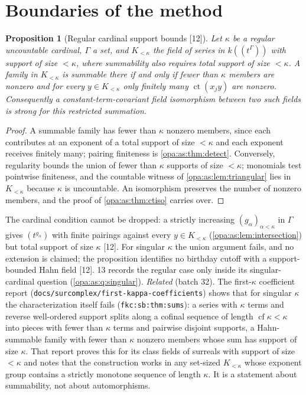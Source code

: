 \documentclass[11pt,oneside]{article}
\numberwithin{equation}{section}
\newtheorem{proposition}[proposition]{Proposition}
\theoremstyle{definition}
\theoremstyle{remark}
\newcommand{\ct}{\operatorname{ct}}
\newcommand{\Hahn}[2]{#1((t^{#2}))}
\newcommand{\src}[1]{\textup{\textsf{\small[#1]}}}
\newcommand{\lbl}[1]{\nolinkurl{#1}}
\newcommand{\fn}[1]{\nolinkurl{#1}}
\begin{document}
\section{Boundaries of the method}\label{opa:as:sec:bound}

\begin{proposition}[Regular cardinal support bounds \src{12}]\label{opa:as:prop:kappa}
Let $\kappa$ be a regular uncountable cardinal, $\Gamma$ a set, and $K_{<\kappa}$ the field of series in $\Hahn k\Gamma$
with support of size $<\kappa$, where summability also requires total support of size $<\kappa$. A family in
$K_{<\kappa}$ is summable there if and only if fewer than $\kappa$ members are nonzero and for every $y\in K_{<\kappa}$
only finitely many $\ct(x_jy)$ are nonzero. Consequently a constant-term-covariant field isomorphism between two such
fields is strong for this restricted summation.
\end{proposition}
\begin{proof}
A summable family has fewer than $\kappa$ nonzero members, since each contributes at an exponent of a total support of
size $<\kappa$ and each exponent receives finitely many; pairing finiteness is \cref{opa:as:thm:detect}. Conversely,
regularity bounds the union of fewer than $\kappa$ supports of size $<\kappa$; monomials test pointwise finiteness, and
the countable witness of \cref{opa:as:lem:triangular} lies in $K_{<\kappa}$ because $\kappa$ is uncountable. An
isomorphism preserves the number of nonzero members, and the proof of \cref{opa:as:thm:ctiso} carries over.
\end{proof}

The cardinal condition cannot be dropped: a strictly increasing $(g_\alpha)_{\alpha<\kappa}$ in $\Gamma$ gives
$(t^{g_\alpha})$ with finite pairings against every $y\in K_{<\kappa}$ (\cref{opa:as:lem:intersection}) but total
support of size $\kappa$ \src{12}. For singular $\kappa$ the union argument fails, and no extension is claimed; the
proposition identifies no birthday cutoff with a support-bounded Hahn field \src{12}. 13 records the regular case only
inside its singular-cardinal question (\cref{opa:as:q:singular}).
\emph{Related} (batch 32). The first-$\kappa$ coefficient report
(\fn{docs/surcomplex/first-kappa-coefficients}) shows that for singular $\kappa$ the characterization itself fails
(\lbl{fkc:sb:thm:sums}): a series with $\kappa$ terms and reverse well-ordered support splits along a cofinal
sequence of length $\operatorname{cf}\kappa<\kappa$ into pieces with fewer than $\kappa$ terms and pairwise disjoint
supports, a Hahn-summable family with fewer than $\kappa$ nonzero members whose sum has support of size $\kappa$.
That report proves this for its class fields of surreals with support of size $<\kappa$ and notes that the
construction works in any set-sized $K_{<\kappa}$ whose exponent group contains a strictly monotone sequence of
length $\kappa$. It is a statement about summability, not about automorphisms.
\end{document}

